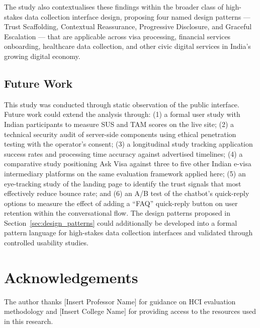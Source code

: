 \documentclass[journal, 10pt, twoside]{IEEEtran}
\begin{document}
The study also contextualises these findings within the broader class of
high-stakes data collection interface design, proposing four named design
patterns --- Trust Scaffolding, Contextual Reassurance, Progressive
Disclosure, and Graceful Escalation --- that are applicable across visa
processing, financial services onboarding, healthcare data collection,
and other civic digital services in India's growing digital economy.

\subsection{Future Work}
This study was conducted through static observation of the public interface.
Future work could extend the analysis through: (1) a formal user study with
Indian participants to measure SUS and TAM scores on the live site; (2) a
technical security audit of server-side components using ethical penetration
testing with the operator's consent; (3) a longitudinal study tracking
application success rates and processing time accuracy against advertised
timelines; (4) a comparative study positioning Ask Visa against three to
five other Indian e-visa intermediary platforms on the same evaluation
framework applied here; (5) an eye-tracking study of the landing page to
identify the trust signals that most effectively reduce bounce rate; and
(6) an A/B test of the chatbot's quick-reply options to measure the effect
of adding a ``FAQ'' quick-reply button on user retention within the
conversational flow. The design patterns proposed in Section~\ref{sec:design_patterns}
could additionally be developed into a formal pattern language for high-stakes
data collection interfaces and validated through controlled usability studies.

\section*{Acknowledgements}
The author thanks [Insert Professor Name] for guidance on HCI evaluation
methodology and [Insert College Name] for providing access to the resources
used in this research.
\end{document}
